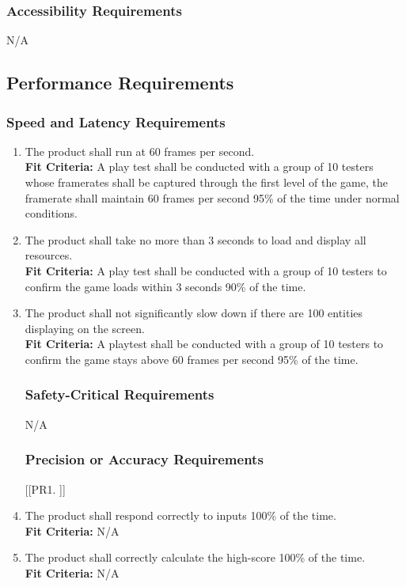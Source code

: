 \documentclass[12pt, titlepage]{article}
\begin{document}
\subsubsection{Accessibility Requirements}
N/A



\subsection{Performance Requirements}

\subsubsection{Speed and Latency Requirements}
\begin{enumerate}[{PR}1. ]
    \item The product shall run at 60 frames per second.\\
    \textbf{Fit Criteria:} A play test shall be conducted with a group of 10 testers whose framerates shall be captured through the first level of the game, the framerate shall maintain 60 frames per second 95\% of the time under normal conditions.
    \item The product shall take no more than 3 seconds to load and display all resources.\\
    \textbf{Fit Criteria:} A play test shall be conducted with a group of 10 testers to confirm the game loads within 3 seconds 90\% of the time.
    \item The product shall not significantly slow down if there are 100 entities displaying on the screen.\\
    \textbf{Fit Criteria:} A playtest shall be conducted with a group of 10 testers to confirm the game stays above 60 frames per second 95\% of the time.

\subsubsection{Safety-Critical Requirements}
N/A

\subsubsection{Precision or Accuracy Requirements}
[{[{PR}1. ]}]
    \item The product shall respond correctly to inputs 100\% of the time.\\
    \textbf{Fit Criteria:} N/A
    \item The product shall correctly calculate the high-score 100\% of the time.\\
    \textbf{Fit Criteria:} N/A


\end{enumerate}
\end{document}
